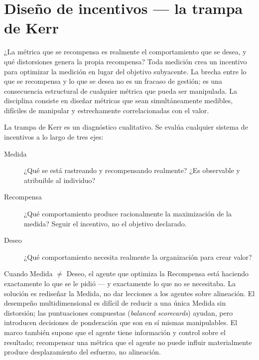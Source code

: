 \section{Diseño de incentivos --- la trampa de Kerr}\label{sec:kerr-trap}

¿La métrica que se recompensa es realmente el comportamiento que se desea, y qué distorsiones genera la propia recompensa? Toda medición crea un incentivo para optimizar la medición en lugar del objetivo subyacente. La brecha entre lo que se recompensa y lo que se desea no es un fracaso de gestión; es una consecuencia estructural de cualquier métrica que pueda ser manipulada. La disciplina consiste en diseñar métricas que sean simultáneamente medibles, difíciles de manipular y estrechamente correlacionadas con el valor.

La trampa de Kerr es un diagnóstico cualitativo. Se evalúa cualquier sistema de incentivos a lo largo de tres ejes:
\begin{description}
  \item[Medida] ¿Qué se está rastreando y recompensando realmente? ¿Es observable y atribuible al individuo?
  \item[Recompensa] ¿Qué comportamiento produce racionalmente la maximización de la medida? Seguir el incentivo, no el objetivo declarado.
  \item[Deseo] ¿Qué comportamiento necesita realmente la organización para crear valor?
\end{description}
Cuando Medida $\ne$ Deseo, el agente que optimiza la Recompensa está haciendo exactamente lo que se le pidió --- y exactamente lo que no se necesitaba. La solución es rediseñar la Medida, no dar lecciones a los agentes sobre alineación. El desempeño multidimensional es difícil de reducir a una única Medida sin distorsión; las puntuaciones compuestas (\emph{balanced scorecards}) ayudan, pero introducen decisiones de ponderación que son en sí mismas manipulables. El marco también supone que el agente tiene información y control sobre el resultado; recompensar una métrica que el agente no puede influir materialmente produce desplazamiento del esfuerzo, no alineación.

